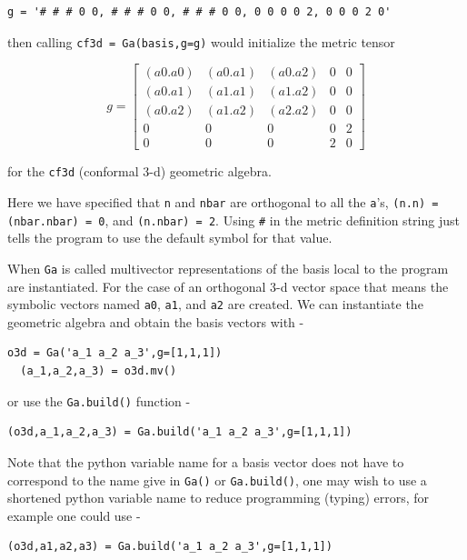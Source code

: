 \documentclass[12pt]{report}
\newcommand{\lbrk}{\left [}
\newcommand{\rbrk}{\right ]}
\newcommand{\T}[1]{\texttt{#1}}
\begin{document}
\begin{lstlisting}[numbers=none]
  g = '# # # 0 0, # # # 0 0, # # # 0 0, 0 0 0 0 2, 0 0 0 2 0'
\end{lstlisting}

then calling \T{cf3d = Ga(basis,g=g)} would initialize the metric tensor

  \begin{equation}
  g = \lbrk
  \begin{array}{ccccc}
    (a0.a0) & (a0.a1)  & (a0.a2) & 0 & 0\\
    (a0.a1) & (a1.a1)  & (a1.a2) & 0 & 0\\
    (a0.a2) & (a1.a2)  & (a2.a2) & 0 & 0 \\
    0 & 0 & 0 & 0 & 2 \\
    0 & 0 & 0 & 2 & 0
  \end{array}
  \rbrk
  \end{equation}

for the  \T{cf3d} (conformal 3-d) geometric algebra.

Here we have specified that \T{n} and \T{nbar} are orthogonal to all the
\T{a}'s, \T{(n.n) = (nbar.nbar) = 0}, and \T{(n.nbar) = 2}. Using
\T{\#} in the metric definition string just tells the program to use the
default symbol for that value.

When \T{Ga} is called multivector representations of the basis local to
the program are instantiated.  For the case of an orthogonal 3-d vector
space that means the
symbolic vectors named \T{a0}, \T{a1}, and \T{a2} are created. We can
instantiate the geometric algebra and obtain the basis vectors with -

\begin{lstlisting}[numbers=none]
  o3d = Ga('a_1 a_2 a_3',g=[1,1,1])
  (a_1,a_2,a_3) = o3d.mv()
\end{lstlisting}

or use the \T{Ga.build()} function -

\begin{lstlisting}[numbers=none]
  (o3d,a_1,a_2,a_3) = Ga.build('a_1 a_2 a_3',g=[1,1,1])
\end{lstlisting}

Note that the python variable name for a basis vector does not have to
correspond to the name give in \T{Ga()} or \T{Ga.build()}, one may wish to use a
shortened python variable name to reduce programming (typing) errors, for
example one could use -

\begin{lstlisting}[numbers=none]
  (o3d,a1,a2,a3) = Ga.build('a_1 a_2 a_3',g=[1,1,1])
\end{lstlisting}
\end{document}
